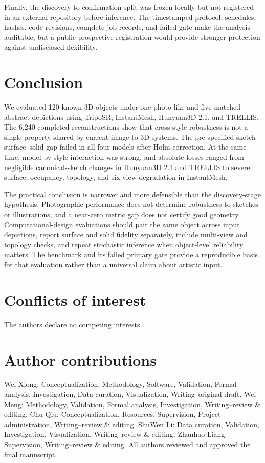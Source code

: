 \documentclass[12pt,a4paper]{article}
\begin{document}
Finally, the discovery-to-confirmation split was frozen locally but not registered in an external repository before inference. The timestamped protocol, schedules, hashes, code revisions, complete job records, and failed gate make the analysis auditable, but a public prospective registration would provide stronger protection against undisclosed flexibility.

\section{Conclusion}

We evaluated 120 known 3D objects under one photo-like and five matched abstract depictions using TripoSR, InstantMesh, Hunyuan3D 2.1, and TRELLIS. The 6,240 completed reconstructions show that cross-style robustness is not a single property shared by current image-to-3D systems. The pre-specified sketch surface--solid gap failed in all four models after Holm correction. At the same time, model-by-style interaction was strong, and absolute losses ranged from negligible canonical-sketch changes in Hunyuan3D 2.1 and TRELLIS to severe surface, occupancy, topology, and six-view degradation in InstantMesh.

The practical conclusion is narrower and more defensible than the discovery-stage hypothesis. Photographic performance does not determine robustness to sketches or illustrations, and a near-zero metric gap does not certify good geometry. Computational-design evaluations should pair the same object across input depictions, report surface and solid fidelity separately, include multi-view and topology checks, and repeat stochastic inference when object-level reliability matters. The benchmark and its failed primary gate provide a reproducible basis for that evaluation rather than a universal claim about artistic input.

\section*{Conflicts of interest}

The authors declare no competing interests.

\section*{Author contributions}

Wei Xiong: Conceptualization, Methodology, Software, Validation, Formal analysis, Investigation, Data curation, Visualization, Writing--original draft. Wei Meng: Methodology, Validation, Formal analysis, Investigation, Writing--review \& editing. Chu Qiu: Conceptualization, Resources, Supervision, Project administration, Writing--review \& editing. ShuWen Li: Data curation, Validation, Investigation, Visualization, Writing--review \& editing. Zhanhao Liang: Supervision, Writing--review \& editing. All authors reviewed and approved the final manuscript.
\end{document}
